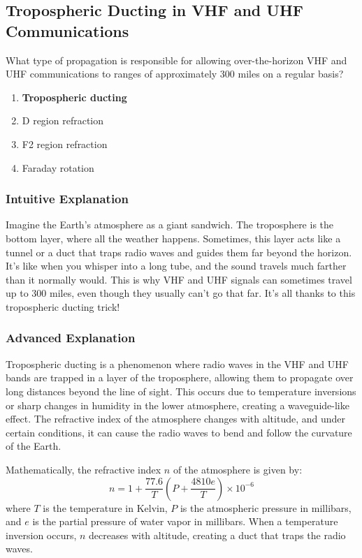 \subsection{Tropospheric Ducting in VHF and UHF Communications}
\label{T3C06}

\begin{tcolorbox}[colback=gray!10!white,colframe=black!75!black,title=T3C06]
What type of propagation is responsible for allowing over-the-horizon VHF and UHF communications to ranges of approximately 300 miles on a regular basis?
\begin{enumerate}[label=\Alph*]
    \item \textbf{Tropospheric ducting}
    \item D region refraction
    \item F2 region refraction
    \item Faraday rotation
\end{enumerate}
\end{tcolorbox}

\subsubsection*{Intuitive Explanation}
Imagine the Earth’s atmosphere as a giant sandwich. The troposphere is the bottom layer, where all the weather happens. Sometimes, this layer acts like a tunnel or a duct that traps radio waves and guides them far beyond the horizon. It’s like when you whisper into a long tube, and the sound travels much farther than it normally would. This is why VHF and UHF signals can sometimes travel up to 300 miles, even though they usually can’t go that far. It’s all thanks to this tropospheric ducting trick!

\subsubsection*{Advanced Explanation}
Tropospheric ducting is a phenomenon where radio waves in the VHF and UHF bands are trapped in a layer of the troposphere, allowing them to propagate over long distances beyond the line of sight. This occurs due to temperature inversions or sharp changes in humidity in the lower atmosphere, creating a waveguide-like effect. The refractive index of the atmosphere changes with altitude, and under certain conditions, it can cause the radio waves to bend and follow the curvature of the Earth.

Mathematically, the refractive index \( n \) of the atmosphere is given by:
\[
n = 1 + \frac{77.6}{T} \left( P + \frac{4810 e}{T} \right) \times 10^{-6}
\]
where \( T \) is the temperature in Kelvin, \( P \) is the atmospheric pressure in millibars, and \( e \) is the partial pressure of water vapor in millibars. When a temperature inversion occurs, \( n \) decreases with altitude, creating a duct that traps the radio waves.

